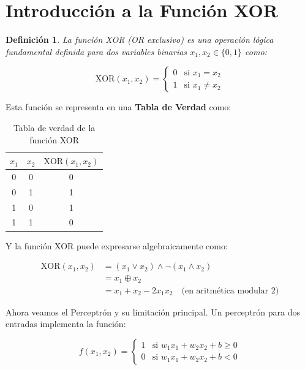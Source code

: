 \documentclass[12pt]{article}
\newtheorem {definition}{Definición}
\begin{document}
\section{Introducción a la Función XOR}

\begin{definition}
    La función XOR (OR exclusivo) es una operación lógica fundamental definida para dos variables binarias $x_1, x_2 \in \{0,1\}$ como:

\begin{equation}
\text{XOR}(x_1, x_2) = 
\begin{cases}
0 & \text{si } x_1 = x_2 \\
1 & \text{si } x_1 \neq x_2
\end{cases}
\end{equation}
\end{definition}

\newpage
Esta función se representa en una \textbf{Tabla de Verdad} como:

\begin{table}[h]
\centering
\begin{tabular}{ccc}
\toprule
$x_1$ & $x_2$ & $\text{XOR}(x_1, x_2)$ \\
\midrule
0 & 0 & 0 \\
0 & 1 & 1 \\
1 & 0 & 1 \\
1 & 1 & 0 \\
\bottomrule
\end{tabular}
\caption{Tabla de verdad de la función XOR}
\end{table}

Y la función XOR puede expresarse algebraicamente como:

\begin{align}
\text{XOR}(x_1, x_2) &= (x_1 \lor x_2) \land \neg(x_1 \land x_2) \\
&= x_1 \oplus x_2 \\
&= x_1 + x_2 - 2x_1x_2 \quad \text{(en aritmética modular 2)}
\end{align}

Ahora veamos el Perceptrón y su limitación principal. Un perceptrón para dos entradas implementa la función:

\begin{equation}
f(x_1, x_2) = 
\begin{cases}
1 & \text{si } w_1x_1 + w_2x_2 + b \geq 0 \\
0 & \text{si } w_1x_1 + w_2x_2 + b < 0
\end{cases}
\end{equation}
\end{document}
